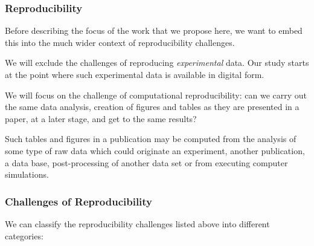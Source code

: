 \medskip

\subsubsection{Reproducibility}\label{sec:concept}\label{sec:reproducibility}

Before describing the focus of the work that we propose here, we want to embed
this into the much wider context of reproducibility challenges.

We will exclude the challenges of reproducing \emph{experimental} data. Our
study starts at the point where such experimental data is available in digital
form.

We will focus on the challenge of computational reproducibility: can we carry out
the same data analysis, creation of figures and tables as they are presented in
a paper, at a later stage, and get to the same results?

Such tables and figures in a publication may be computed from the analysis of
some type of raw data which could originate an experiment, another publication,
a data base, post-processing of another data set or from executing computer
simulations.


\subsubsection{Challenges of Reproducibility}\label{sec:reproducibility-challenges}

We can classify the reproducibility challenges listed above into different categories:

